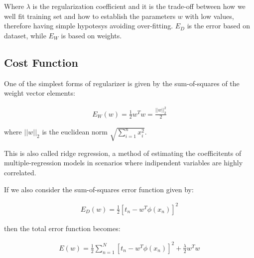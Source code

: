 \noindent Where $\lambda$ is the regularization coefficient and it is the trade-off between how we well fit training set and how to establish the parameters $w$ with low values, therefore having simple hypotesys avoiding over-fitting. $E_D$ is the error based on dataset, while $E_W$ is based on weights.

\subsection{Cost Function}
\label{subsec:regcostfun}

One of the simplest forms of regularizer is given by the sum-of-squares of the weight vector elements:
\begin{Equation}[H]
	\centering
		\begin{equation}
			\begin{aligned}
				E_W(w) = \frac{1}{2} w^T w = \frac{||w||^2_2}{2}
			\end{aligned}
		\end{equation}
	\label{eq:mathmodelaada}
\end{Equation}

\noindent where $||w||_2$ is the euclidean norm $\sqrt{ \sum_{i=1}^{n} x^2_i}$.

\noindent This is also called ridge regression, a method of estimating the coefficitents of multiple-regression models in scenarios where indipendent variables are highly correlated.

\noindent If we also consider the sum-of-squares error function given by:
\begin{Equation}[H]
	\centering
		\begin{equation}
			\begin{aligned}
				E_D(w) = \frac{1}{2} [t_n - w^T \phi(x_n)]^2
			\end{aligned}
		\end{equation}
	\label{eq:mathmodelaada}
\end{Equation}

\noindent then the total error function becomes:

\begin{Equation}[H]
	\centering
		\begin{equation}
			\begin{aligned}
				E(w) = \frac{1}{2} \sum_{n=1}^{N}[t_n - w^T \phi(x_n)]^2 + \frac{\lambda}{2} w^T w
			\end{aligned}
		\end{equation}
	\label{eq:mathmodelaada}
\end{Equation}

